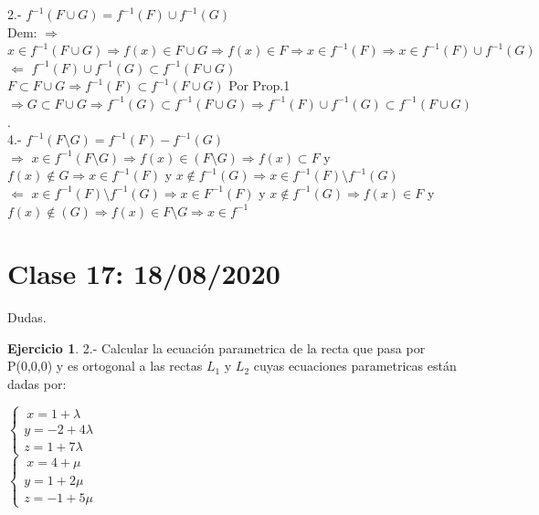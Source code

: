 \documentclass[secnumarabic,balancelastpage,amsmath,amssymb]{article}
\theoremstyle{remark}
\theoremstyle{definition}
\theoremstyle{prop}
\newtheorem{ejer}{Ejercicio}
\begin{document}
2.- $f^{-1}(F \cup G)= f^{-1}(F) \cup f^{-1}(G)$\\
Dem: $\Rightarrow$ $x \in f^{-1}(F \cup G) \Rightarrow f(x) \in F \cup G \Rightarrow f(x) \in F \Rightarrow x \in f^{-1}(F) \Rightarrow x \in f^{-1}(F) \cup f^{-1}(G) $\\

$\Leftarrow$ $f^{-1}(F) \cup f^{-1}(G) \subset f^{-1}(F \cup G)$\\
$F \subset F \cup G \Rightarrow f^{-1}(F) \subset  f^{-1}(F \cup G)$ Por Prop.1 $\Rightarrow G \subset F \cup G \Rightarrow f^{-1}(G) \subset  f^{-1}(F \cup G) \Rightarrow f^{-1}(F) \cup  f^{-1}(G) \subset f^{-1}(F \cup G)$. \\

4.- $f^{-1}(F \setminus G)= f^{-1}(F)-f^{-1}(G)$\\
$\Rightarrow$ $x \in f^{-1}(F \setminus G) \Rightarrow f(x) \in (F \setminus G) \Rightarrow f(x) \subset F$ y $f(x) \not\in G \Rightarrow x \in f^{-1}(F)$ y $x \not\in f^{-1}(G) \Rightarrow x \in f^{-1}(F) \setminus  f^{-1}(G)$\\

$\Leftarrow$ $x \in f^{-1}(F) \setminus f^{-1} (G) \Rightarrow x \in F^{-1} (F)$ y $ x \not\in f^{-1} (G) \Rightarrow f(x) \in F$ y $ f(x) \not\in (G) \Rightarrow f(x) \in F \setminus G \Rightarrow x \in  f^{-1}$\\


\section{Clase 17: 18/08/2020}
Dudas.\\
\begin{ejer}
{2.- Calcular la ecuación parametrica de la recta que pasa por P(0,0,0) y es ortogonal a las rectas $L_{1}$ y $L_{2}$ cuyas ecuaciones parametricas están dadas por: }
\end{ejer}

\begin{multicols}{2}

 $\left \{
      \begin{array}{rcl}
          \ x=1+\lambda\\
          y=-2+4\lambda \\ 
         z=1+7\lambda 
      \end{array}
   \right . $\\  
   
   
 $\left \{
      \begin{array}{rcl}
          \ x=4+\mu\\
          y=1+2\mu \\ 
         z=-1+5\mu 
      \end{array}
   \right .$\\
     
\end{multicols} 
\end{document}
